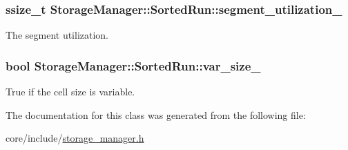 \subsubsection[{segment\+\_\+utilization\+\_\+}]{\setlength{\rightskip}{0pt plus 5cm}ssize\+\_\+t Storage\+Manager\+::\+Sorted\+Run\+::segment\+\_\+utilization\+\_\+\hspace{0.3cm}{\ttfamily [private]}}\label{classStorageManager_1_1SortedRun_a908084f9f138cd5a6c07692b8cc576ea}
The segment utilization. \hypertarget{classStorageManager_1_1SortedRun_affa713c76d1ca0bdba4881fd6ead71b4}{}
\subsubsection[{var\+\_\+size\+\_\+}]{\setlength{\rightskip}{0pt plus 5cm}bool Storage\+Manager\+::\+Sorted\+Run\+::var\+\_\+size\+\_\+\hspace{0.3cm}{\ttfamily [private]}}\label{classStorageManager_1_1SortedRun_affa713c76d1ca0bdba4881fd6ead71b4}
True if the cell size is variable. 

The documentation for this class was generated from the following file\+:\begin{DoxyCompactItemize}
\item 
core/include/\hyperlink{storage__manager_8h}{storage\+\_\+manager.\+h}\end{DoxyCompactItemize}
